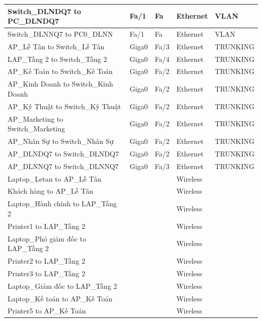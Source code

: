 \documentclass[a4paper, 12pt]{article}
\begin{document}
\begin{center}
\begin{longtable}{|p{}|p{}|p{}|p{}|p{}|}
\hline Switch\_DLNDQ7 to PC\_DLNDQ7     &     Fa/1     &     Fa    &  Ethernet  &  VLAN  \\
\hline Switch\_DLNNQ7 to PC0\_DLNN     &     Fa/1     &     Fa    &  Ethernet  &  VLAN  \\
\hline AP\_Lễ Tân to Switch\_Lễ Tân    &     Giga0     &     Fa/3    &  Ethernet  &  TRUNKING  \\
\hline LAP\_Tầng 2 to Switch\_Tầng 2    &     Giga0     &     Fa/4    &  Ethernet  &  TRUNKING  \\
\hline AP\_Kế Toán to Switch\_Kế Toán    &     Giga0     &     Fa/2    &  Ethernet  &  TRUNKING  \\
\hline AP\_Kinh Doanh to Switch\_Kinh Doanh     &     Giga0     &     Fa/2    &  Ethernet  &  TRUNKING  \\
\hline AP\_Kỹ Thuật to Switch\_Kỹ Thuật     &     Giga0     &     Fa/2    &  Ethernet  &  TRUNKING  \\
\hline AP\_Marketing to Switch\_Marketing     &     Giga0     &     Fa/2    &  Ethernet  &  TRUNKING  \\
\hline AP\_Nhân Sự to Switch\_Nhân Sự     &     Giga0     &     Fa/2    &  Ethernet  &  TRUNKING  \\
\hline AP\_DLNDQ7 to Switch\_DLNDQ7     &     Giga0     &     Fa/2    &  Ethernet  &  TRUNKING  \\
\hline AP\_DLNNQ7 to Switch\_DLNNQ7     &     Giga0     &     Fa/3    &  Ethernet  &  TRUNKING  \\
\hline Laptop\_Letan to AP\_Lễ Tân     &         &        &  Wireless  &   \\
\hline Khách hàng to AP\_Lễ Tân    &         &        &  Wireless  &   \\
\hline Laptop\_Hành chính to LAP\_Tầng 2     &         &        &  Wireless  &   \\
\hline Printer1 to LAP\_Tầng 2    &         &        &  Wireless  &   \\
\hline Laptop\_Phó giám đốc to LAP\_Tầng 2     &         &        &  Wireless  &   \\
\hline Printer2 to LAP\_Tầng 2    &         &        &  Wireless  &   \\
\hline Printer3 to LAP\_Tầng 2     &         &        &  Wireless  &   \\
\hline Laptop\_Giám đốc to LAP\_Tầng 2     &         &        &  Wireless  &   \\
\hline Laptop\_Kế toán to AP\_Kế Toán     &         &        &  Wireless  &   \\
\hline Printer5 to AP\_Kế Toán     &         &        &  Wireless  &   \\

\end{longtable}
\end{center}
\end{document}
